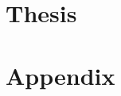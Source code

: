 \part{Thesis}\label{pt:thesis}









\appendix

\part{Appendix}
%





\appendix
\nocite{*} 
    
 

